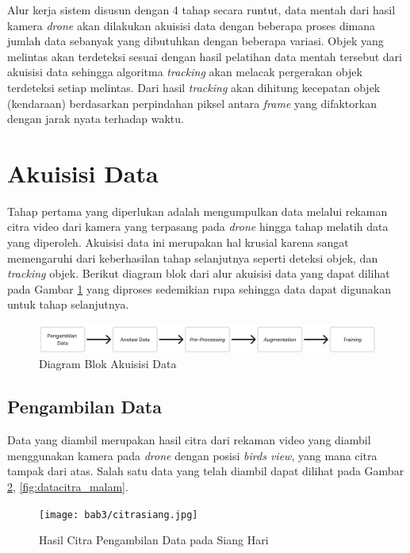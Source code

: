 Alur kerja sistem disusun dengan 4 tahap secara runtut, data mentah dari hasil kamera \emph{drone} akan dilakukan akuisisi data dengan beberapa proses dimana jumlah data sebanyak yang dibutuhkan dengan beberapa variasi. Objek yang melintas akan terdeteksi sesuai dengan hasil pelatihan data mentah tersebut dari akuisisi data sehingga algoritma \emph{tracking} akan melacak pergerakan objek terdeteksi setiap melintas. Dari hasil \emph{tracking} akan dihitung kecepatan objek (kendaraan) berdasarkan perpindahan piksel antara \emph{frame} yang difaktorkan dengan jarak nyata terhadap waktu.


\section{Akuisisi Data}
Tahap pertama yang diperlukan adalah mengumpulkan data melalui rekaman citra video dari kamera yang terpasang pada \emph{drone} hingga tahap melatih data yang diperoleh. Akuisisi data ini merupakan hal krusial karena sangat memengaruhi dari keberhasilan tahap selanjutnya seperti deteksi objek, dan \emph{tracking} objek. Berikut diagram blok dari alur akuisisi data yang dapat dilihat pada Gambar \ref{fig:akuisisidata} yang diproses sedemikian rupa sehingga data dapat digunakan untuk tahap selanjutnya.

\begin{figure} [H] \centering
  \includegraphics[scale=0.35]{bab3/akuisisidata.jpg}
  \caption{Diagram Blok Akuisisi Data}
  \label{fig:akuisisidata}
\end{figure}

\subsection{Pengambilan Data}
Data yang diambil merupakan hasil citra dari rekaman video yang diambil menggunakan kamera pada \emph{drone} dengan posisi \emph{birds view}, yang mana citra tampak dari atas. Salah satu data yang telah diambil dapat dilihat pada Gambar \ref{fig:datacitra_siang}, \ref{fig:datacitra_malam}.

\begin{figure} [H] \centering
  \texttt{[image: bab3/citrasiang.jpg]}
  \caption{Hasil Citra Pengambilan Data pada Siang Hari}
  \label{fig:datacitra_siang}
\end{figure}

